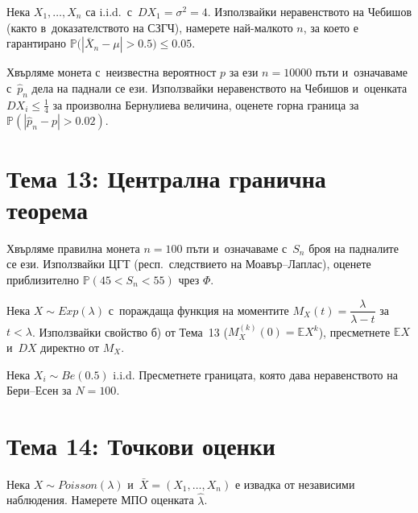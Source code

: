 \begin{probbox}[Задача 12.2]
Нека $X_1,\dots,X_n$ са i.i.d.\ с~$DX_1=\sigma^2=4$. Използвайки
неравенството на Чебишов (както в~доказателството на СЗГЧ), намерете
най-малкото $n$, за което е гарантирано $\mathbb P\big(|\overline
X_n-\mu|>0.5\big)\le0.05$.
\end{probbox}

\begin{probbox}[Задача 12.3]
Хвърляме монета с~неизвестна вероятност $p$ за ези $n=10000$ пъти и~означаваме с~$\hat p_n$ дела на паднали се ези. Използвайки
неравенството на Чебишов и~оценката $DX_i\le\tfrac14$ за произволна
Бернулиева величина, оценете горна граница за $\mathbb P(|\hat p_n-
p|>0.02)$.
\end{probbox}

\section*{Тема 13: Централна гранична теорема}

\begin{probbox}[Задача 13.1]
Хвърляме правилна монета $n=100$ пъти и~означаваме с~$S_n$ броя на
падналите се ези. Използвайки ЦГТ (респ.\ следствието на
Моавър--Лаплас), оценете приблизително $\mathbb P(45<S_n<55)$ чрез
$\Phi$.
\end{probbox}

\begin{probbox}[Задача 13.2]
Нека $X\sim Exp(\lambda)$ с~пораждаща функция на моментите
$M_X(t)=\dfrac\lambda{\lambda-t}$ за $t<\lambda$. Използвайки
свойство б) от Тема~13 ($M_X^{(k)}(0)=\mathbb EX^k$), пресметнете
$\mathbb EX$ и~$DX$ директно от $M_X$.
\end{probbox}

\begin{probbox}[Задача 13.3]
Нека $X_i\sim Be(0.5)$ i.i.d. Пресметнете границата, която дава
неравенството на Бери--Есен за $N=100$.
\end{probbox}

\section*{Тема 14: Точкови оценки}

\begin{probbox}[Задача 14.1]
Нека $X\sim Poisson(\lambda)$ и~$\bar X=(X_1,\dots,X_n)$ е извадка от
независими наблюдения. Намерете МПО оценката $\hat\lambda$.
\end{probbox}

